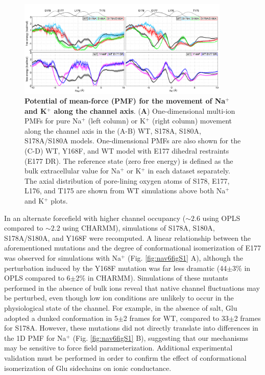 \begin{refsection}
\begin{figure}[!ptb]
\centering
\includegraphics[width=0.9\textwidth]{nav6/Nav6Fig3}
\caption[Potential of mean-force (PMF) for the movement of Na$^+$ and K$^+$ along the channel axis]{\textbf{Potential of mean-force (PMF) for the movement of Na$^+$ and K$^+$ along the channel axis}. (\textbf{A}) One-dimensional multi-ion PMFs for pure Na$^+$ (left column) or K$^+$ (right column) movement along the channel axis in the (A-B) WT, S178A, S180A, S178A/S180A models. One-dimensional PMFs are also shown for the (C-D) WT, Y168F, and WT model with E177 dihedral restraints (E177 DR). The reference state (zero free energy) is defined as the bulk extracellular value for Na$^+$ or K$^+$ in each dataset separately. The axial distribution of pore-lining oxygen atoms of S178, E177, L176, and T175 are shown from WT simulations above both Na$^+$ and K$^+$ plots.}
\label{fig:nav6fig3}
\end{figure}

In an alternate forcefield with higher channel occupancy ($\sim 2.6$ using OPLS compared to $\sim 2.2$ using CHARMM), simulations of S178A, S180A, S178A/S180A, and Y168F were recomputed. A linear relationship between the aforementioned mutations and the degree of conformational isomerization of E177 was observed for simulations with Na$^+$ (Fig. \ref{fig:nav6figS1} A), although the perturbation induced by the Y168F mutation was far less dramatic (44$\pm$3\% in OPLS compared to 6$\pm$2\% in CHARMM). Simulations of these mutants performed in the absence of bulk ions reveal that native channel fluctuations may be perturbed, even though low ion conditions are unlikely to occur in the physiological state of the channel. For example, in the absence of salt, Glu adopted a dunked conformation in 5$\pm$2 frames for WT, compared to 33$\pm$2 frames for S178A. However, these mutations did not directly translate into differences in the 1D PMF for Na$^+$ (Fig. \ref{fig:nav6figS1} B), suggesting that our mechanisms may be sensitive to force field parameterization. Additional experimental validation must be performed in order to confirm the effect of conformational isomerization of Glu sidechains on ionic conductance.


\end{refsection}
